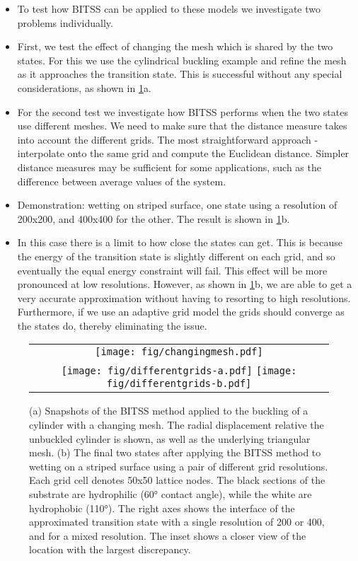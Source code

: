 \documentclass[aps,twocolumn]{revtex4}
\begin{document}
\begin{itemize}
\item
To test how BITSS can be applied to these models we investigate two problems individually.
\item
First, we test the effect of changing the mesh which is shared by the two states.
For this we use the cylindrical buckling example and refine the mesh as it approaches the transition state.
This is successful without any special considerations, as shown in \cref{fig:differentgrids}a.
\item
For the second test we investigate how BITSS performs when the two states use different meshes.
We need to make sure that the distance measure takes into account the different grids.
The most straightforward approach - interpolate onto the same grid and compute the Euclidean distance.
Simpler distance measures may be sufficient for some applications, such as the difference between average values of the system.
\item
Demonstration: wetting on striped surface, one state using a resolution of 200x200, and 400x400 for the other.
The result is shown in \cref{fig:differentgrids}b.
\item
In this case there is a limit to how close the states can get.
This is because the energy of the transition state is slightly different on each grid, and so eventually the equal energy constraint will fail.
This effect will be more pronounced at low resolutions.
However, as shown in \cref{fig:differentgrids}b, we are able to get a very accurate approximation without having to resorting to high resolutions.
Furthermore, if we use an adaptive grid model the grids should converge as the states do, thereby eliminating the issue.
\end{itemize}

\begin{figure}[htb]
  \centering
  \begin{tabular}[b]{c}
    \texttt{[image: fig/changingmesh.pdf]}\\
    \texttt{[image: fig/differentgrids-a.pdf]}%
    \texttt{[image: fig/differentgrids-b.pdf]}%
  \end{tabular}
  \caption{
    (a) Snapshots of the BITSS method applied to the buckling of a cylinder with a changing mesh.
        The radial displacement relative the unbuckled cylinder is shown, as well as the underlying triangular mesh.
    (b) The final two states after applying the BITSS method to wetting on a striped surface using a pair of different grid resolutions.
        Each grid cell denotes 50x50 lattice nodes.
        The black sections of the substrate are hydrophilic (60\si{\degree} contact angle), while the white are hydrophobic (110\si{\degree}).
        The right axes shows the interface of the approximated transition state with a single resolution of 200 or 400, and for a mixed resolution.
        The inset shows a closer view of the location with the largest discrepancy.
  }
  \label{fig:differentgrids}
\end{figure}
\end{document}

